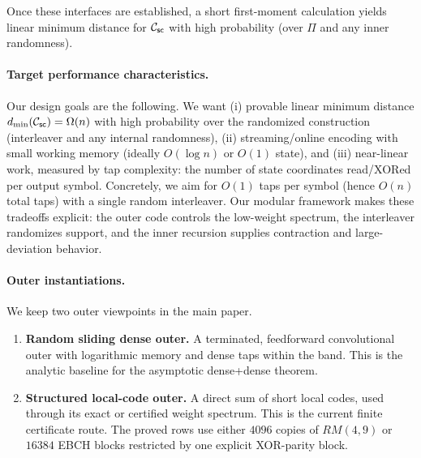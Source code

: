 Once these interfaces are established, a short first-moment calculation yields linear minimum distance for \({\mathcal{C}_{\mathsf{sc}}}\) with high probability
(over \(\Pi\) and any inner randomness).

\paragraph{Target performance characteristics.}
Our design goals are the following.
We want (i) provable linear minimum distance \(d_{\min}({\mathcal{C}_{\mathsf{sc}}})=\Omega(n)\) with high probability over the randomized construction
(interleaver and any internal randomness), (ii) streaming/online encoding with small working memory (ideally \(O(\log n)\) or \(O(1)\) state),
and (iii) near-linear work, measured by tap complexity: the number of state coordinates read/XORed per output symbol.
Concretely, we aim for \(O(1)\) taps per symbol (hence \(O(n)\) total taps) with a single random interleaver.
Our modular framework makes these tradeoffs explicit: the outer code controls the low-weight spectrum, the interleaver randomizes support,
and the inner recursion supplies contraction and large-deviation behavior.


\paragraph{Outer instantiations.}
We keep two outer viewpoints in the main paper.
\begin{enumerate}
\item \textbf{Random sliding dense outer.}
A terminated, feedforward convolutional outer with logarithmic memory and dense taps within the band.  This is the
analytic baseline for the asymptotic dense+dense theorem.
\item \textbf{Structured local-code outer.}
A direct sum of short local codes, used through its exact or certified weight spectrum.  This is the current finite
certificate route.  The proved rows use either \(4096\) copies of \(RM(4,9)\)
or \(16384\) EBCH blocks restricted by one explicit XOR-parity block.
\end{enumerate}

